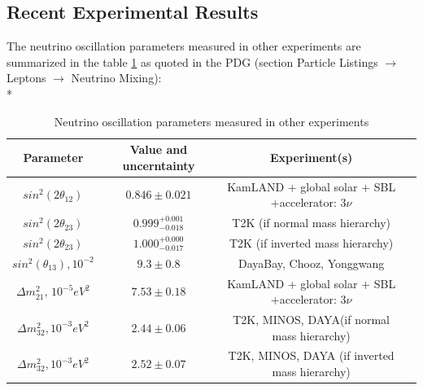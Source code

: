 \subsection{Recent Experimental Results}
The neutrino oscillation parameters measured in other experiments are summarized in the table \ref{tab:MeasuredPars} as quoted in the PDG \cite{ref_PDG} (section Particle Listings $\rightarrow$ Leptons $\rightarrow$ Neutrino Mixing):\\*
\begin{table}[h]
  \begin{center}
  \caption{ Neutrino oscillation parameters measured in other experiments}
  \begin{tabular}{|c|c|c|c|}
     Parameter & Value and uncerntainty & Experiment(s) \\ \hline
     $sin^2(2\theta_{12})$ &  $0.846\pm0.021$  &  KamLAND + global solar + SBL +accelerator: 3$\nu$  \\ \hline 
     $sin^2(2\theta_{23})$ &  $0.999^{+0.001}_{-0.018}$  &  T2K (if normal mass hierarchy)   \\ \hline 
     $sin^2(2\theta_{23})$ &  $1.000^{+0.000}_{-0.017}$  &  T2K (if inverted mass hierarchy)   \\ \hline 
     $sin^2(\theta_{13}), 10^{-2}$ &  $9.3\pm0.8$  &  DayaBay, Chooz, Yonggwang    \\ \hline 
     ${\Delta}m^2_{21}$, $10^{-5} eV^2$ &  $7.53\pm0.18$  &  KamLAND + global solar + SBL +accelerator: 3$\nu$   \\ \hline 
     ${\Delta}m^2_{32}, 10^{-3} eV^2$ &  $2.44\pm0.06$  &  T2K, MINOS, DAYA(if normal mass hierarchy)     \\ \hline
     ${\Delta}m^2_{32}, 10^{-3} eV^2$ &  $2.52\pm0.07$  &  T2K, MINOS, DAYA (if inverted mass hierarchy)     \\ \hline 
  \end{tabular}
  \label{tab:MeasuredPars}
  \end{center}
\end{table}


